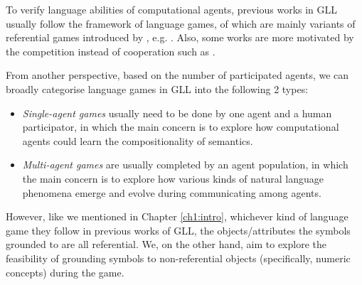 To verify language abilities of computational agents, previous works in GLL usually follow the framework of language games, of which are mainly variants of referential games introduced by \cite{lewis2008convention}, e.g. \cite{hermann2017grounded, havrylov2017emergence}. Also, some works are more motivated by the competition instead of cooperation such as \cite{cao2018emergent}.

From another perspective, based on the number of participated agents, we can broadly categorise language games in GLL into the following 2 types:

\begin{itemize}
  \item \textit{Single-agent games} usually need to be done by one agent and a human participator, in which the main concern is to explore how computational agents could learn the compositionality of semantics.
  \item \textit{Multi-agent games} are usually completed by an agent population, in which the main concern is to explore how various kinds of natural language phenomena emerge and evolve during communicating among agents.
\end{itemize}

However, like we mentioned in Chapter \ref{ch1:intro}, whichever kind of language game they follow in previous works of GLL, the objects/attributes the symbols grounded to are all referential. We, on the other hand, aim to explore the feasibility of grounding symbols to non-referential objects (specifically, numeric concepts) during the game.